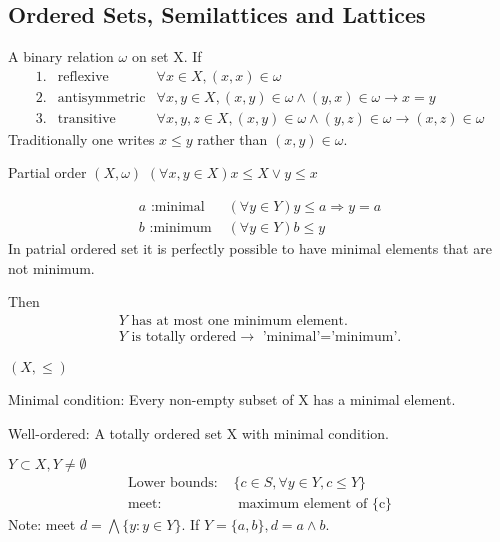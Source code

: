 \subsection[3]{Ordered Sets, Semilattices and Lattices}

\begin{Def}A binary relation $\omega$ on set X. If 
    \begin{align*}
        1. & \text{reflexive} & \forall x \in X,(x,x) \in \omega   \\
        2. & \text{antisymmetric} & \forall x,y\in X,(x,y)\in \omega \wedge (y,x)\in \omega \rightarrow x=y    \\
        3. & \text{transitive} & \forall x,y,z \in X, (x,y)\in \omega \wedge (y,z)\in \omega \rightarrow (x,z)\in \omega
    \end{align*}
    Traditionally one writes $x\leq y$ rather than $(x,y)\in \omega$.
\end{Def}
\begin{Def} Partial order $(X,\omega)$
    $(\forall x,y\in X)x\leq X \vee y\leq x$   
\end{Def}

\begin{Def}
    \begin{align*}
        a\text{ :minimal } & (\forall y\in Y)y\leq a \Rightarrow y=a   \\
        b\text{ :minimum } & (\forall y \in Y)b\leq y
    \end{align*}
    In patrial ordered set it is perfectly possible to have minimal elements that are not minimum.
\end{Def}

\begin{Prop}Then
    \begin{align*}
        Y \text{ has at most one minimum element.}  \\
        Y \text{ is totally ordered} \rightarrow \text{ 'minimal'='minimum'.}
    \end{align*}
\end{Prop}

\begin{Def} $(X,\leq)$

    Minimal condition: Every non-empty subset of X has a minimal element.

    Well-ordered: A totally ordered set X with minimal condition.
\end{Def}
\begin{Def}$Y\subset X, Y\neq \emptyset$
    \begin{align*}
        \text{Lower bounds: } & \{c\in S, \forall y\in Y, c\leq Y\}\\
        \text{meet: }   & \text{ maximum element of {\{c\}}}
    \end{align*}
    Note: meet $d=\bigwedge \{y:y\in Y\}$. If $Y=\{a,b\}, d=a\wedge b$.
\end{Def}

